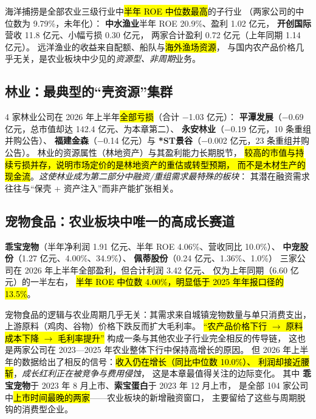 海洋捕捞是全部农业三级行业中\hl{半年 ROE 中位数最高}的子行业
（两家公司的中位数为 \num{9.79}\%，未年化）：
\textbf{中水渔业}半年 ROE \num{20.9}\%、盈利 \num{1.02} 亿元，
\textbf{开创国际}营收 \num{11.8} 亿元、小幅亏损 \num{0.30} 亿元，
两家合计盈利 \num{0.72} 亿元（上年同期 \num{1.14} 亿元）。
远洋渔业的收益来自配额、船队与\hl{海外渔场资源}，
与国内农产品价格几乎无关，是农业板块中少见的\emph{资源型、非周期}业务。

\subsection{林业：最典型的“壳资源”集群}
\label{sec:fishery-forestry}

\num{4} 家林业公司在 2026 年上半年\hl{全部亏损}（合计 \num{-1.03} 亿元）：
\textbf{平潭发展}（\num{-0.69} 亿元，总市值却达 \num{142.4} 亿元、为本章第二）、
\textbf{永安林业}（\num{-0.19} 亿元，\num{10} 条重组并购公告）、
\textbf{福建金森}（\num{-0.14} 亿元）与
\textbf{*ST景谷}（\num{-0.002} 亿元，\num{23} 条重组并购公告）。
林业的资源属性（林地资产）与其盈利能力长期脱节，
\hl{较高的市值与持续亏损并存，说明市场定价的是林地资产的重估或转型预期，
而不是木材生产的现金流}。\emph{这使林业成为第二部分中融资/重组需求最特殊的板块}：
其潜在融资需求往往与“保壳 + 资产注入”而非产能扩张相关。

\subsection{宠物食品：农业板块中唯一的高成长赛道}
\label{sec:fishery-pet}

\textbf{乖宝宠物}（半年净利润 \num{1.91} 亿元、半年 ROE \num{4.06}\%、营收同比 \num{+10.0}\%）、
\textbf{中宠股份}（\num{1.27} 亿元、\num{4.00}\%、\num{+34.9}\%）、
\textbf{佩蒂股份}（\num{0.24} 亿元、\num{1.36}\%、\num{+1.0}\%）
三家公司在 2026 年上半年全部盈利，但合计利润 \num{3.42} 亿元、
仅为上年同期（\num{6.60} 亿元）的一半左右，
\hl{半年 ROE 中位数 \num{4.00}\%，明显低于 2025 年年报口径的 \num{13.5}\%}。

宠物食品的逻辑与农业周期几乎无关：其需求来自城镇宠物数量与单只消费支出，
上游原料（鸡肉、谷物）价格下跌反而扩大毛利率。
\hl{“农产品价格下行 $\to$ 原料成本下降 $\to$ 毛利率提升”}
构成一条与其他农业子行业完全相反的传导链，
这也是两家公司在 2023---2025 年农业整体下行中保持高增长的原因。
但 2026 年上半年的数据给出了相反的信号：\hl{收入仍在增长（同比中位数 \num{+10.0}\%）、
利润却接近腰斩}，\emph{成长红利正在被竞争与费用侵蚀}，
这是本章最值得关注的边际变化。
其中 \textbf{乖宝宠物}于 2023 年 8 月上市、\textbf{索宝蛋白}于 2023 年 12 月上市，
是全部 \num{104} 家公司中\hl{上市时间最晚的两家}——农业板块的新增融资窗口，
主要留给了这些与周期脱钩的消费型企业。

